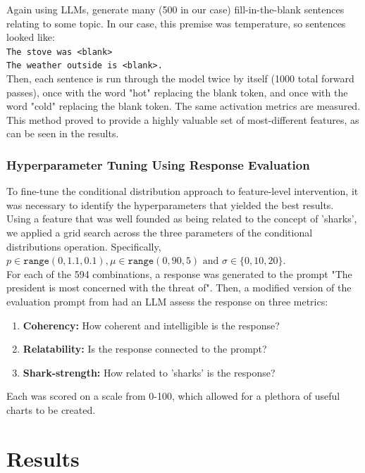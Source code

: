 \documentclass{article}
\begin{document}
Again using LLMs, generate many (500 in our case) fill-in-the-blank sentences relating to some topic. In our case, this premise was temperature, so sentences looked like:\\
\texttt{The stove was <blank>\\The weather outside is <blank>.}\\

Then, each sentence is run through the model twice by itself (1000 total forward passes), once with the word "hot" replacing the blank token, and once with the word "cold" replacing the blank token. The same activation metrics are measured.\\

This method proved to provide a highly valuable set of most-different features, as can be seen in the results.

\subsubsection{Hyperparameter Tuning Using Response Evaluation}

To fine-tune the conditional distribution approach to feature-level intervention, it was necessary to identify the hyperparameters that yielded the best results.\\

Using a feature that was well founded as being related to the concept of 'sharks', we applied a grid search across the three parameters of the conditional distributions operation. Specifically, $p \in \texttt{range}(0,1.1,0.1), \mu \in \texttt{range}(0,90,5) \text{ and } \sigma\in \{0,10,20\}$.\\ 

For each of the 594 combinations, a response was generated to the prompt "The president is most concerned with the threat of". Then, a modified version of the evaluation prompt from \cite{synco} had an LLM assess the response on three metrics:
\begin{enumerate}
    \item \textbf{Coherency:} How coherent and intelligible is the response?
    \item \textbf{Relatability:} Is the response connected to the prompt?
    \item \textbf{Shark-strength:} How related to 'sharks' is the response?
\end{enumerate}
Each was scored on a scale from 0-100, which allowed for a plethora of useful charts to be created.
\section{Results}
\end{document}
